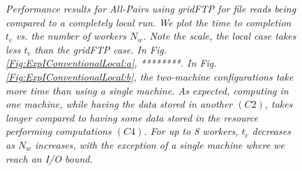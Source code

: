 \documentclass{rspublic}
\begin{document}
\begin{figure}[!ht]
\begin{center}
\caption{\textit{Performance results for All-Pairs using gridFTP for
file reads being compared to a completely local run. We plot the time to completion $t_c$ vs. the number of workers $N_w$. Note the scale, the local case takes less $t_c$  than the gridFTP case. In Fig. \ref{Fig:ExpIConventionalLocal:a}, ********. In Fig. \ref{Fig:ExpIConventionalLocal:b}, the
two-machine configurations take more time than using a single machine. As expected, computing in one machine, while having the data stored in another $(C2)$, takes longer compared to having some data stored in the resource performing computations $(C4)$. For up to 8 workers, $t_c$ decreases as $N_w$ increases, with the exception of a single machine where we reach an I/O bound.}}
\label{Fig:ExpIConventionalLocal}
\end{center}
\end{figure}
\end{document}

